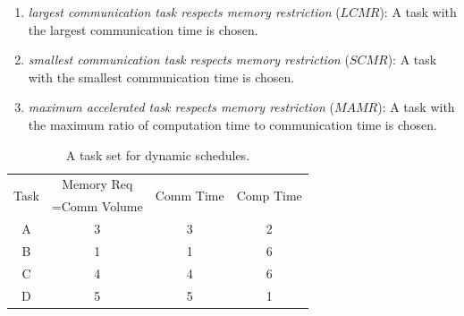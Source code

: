 \documentclass[runningheads]{llncs} %
\begin{document}
\begin{enumerate}[label=\roman*)]
	\item \textit{largest communication task respects memory restriction} ($LCMR$): A task with the largest communication time is chosen. 
	\item \textit{smallest communication task respects memory restriction} ($SCMR$): A task with the smallest communication time is chosen.
	\item \textit{maximum accelerated task respects memory restriction} ($MAMR$): A task with the maximum ratio of computation time to communication time is chosen.
\end{enumerate}
\begin{table}[htb]
	\begin{center}
		
		\begin{tabular}{|c|c|c|c|}
			\hline
			\multirow{2}{*}{Task} & Memory Req & \multirow{2}{*}{Comm Time} & \multirow{2}{*}{Comp Time}\\  
			&=Comm Volume && \\ \hline
			A & 3 & 3 & 2\\ \hline
			B & 1 & 1 &  6\\ \hline
			C & 4 & 4 & 6\\ \hline
			D & 5 & 5 & 1\\ \hline
		\end{tabular}
		\caption{\label{tab:dynamicSelectionExample} A task set for dynamic schedules.}
	\end{center}
\end{table}
\end{document}
